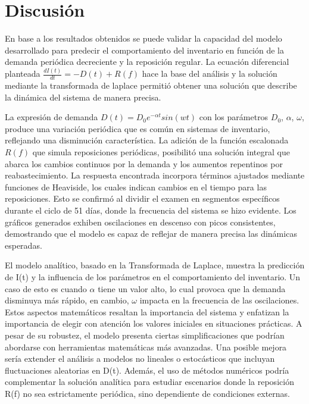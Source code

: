 \documentclass[12pt]{article}
\begin{document}
\section*{Discusión}
En base a los resultados obtenidos se puede validar la capacidad del modelo desarrollado para predecir el comportamiento del inventario en función de la demanda periódica decreciente y la reposición regular. La ecuación diferencial planteada $\frac{dI(t)}{dt} = - D(t) + R(f)$ hace la base del análisis y la solución mediante la transformada de laplace permitió obtener una solución que describe la dinámica del sistema de manera precisa.

La expresión de demanda $D(t) = D_{0}e^{- \alpha t}sin(wt)$ con los parámetros $D_{0}$, $\alpha$, $\omega$, produce una variación periódica que es común en sistemas de inventario, reflejando una disminución característica. La adición de la función escalonada $R(f)$ que simula reposiciones periódicas, posibilitó una solución integral que abarca los cambios continuos por la demanda y los aumentos repentinos por reabastecimiento. La respuesta encontrada incorpora términos ajustados mediante funciones de Heaviside, los cuales indican cambios en el tiempo para las reposiciones. Esto se confirmó al dividir el examen en segmentos específicos durante el ciclo de 51 días, donde la frecuencia del sistema se hizo evidente. Los gráficos generados exhiben oscilaciones en descenso con picos consistentes, demostrando que el modelo es capaz de reflejar de manera precisa las dinámicas esperadas.

El modelo analítico, basado en la Transformada de Laplace, muestra la predicción de I(t) y la influencia de los parámetros en el comportamiento del inventario. Un caso de esto es cuando $\alpha$  tiene un valor alto, lo cual provoca que la demanda disminuya más rápido, en cambio, $\omega$ impacta en la frecuencia de las oscilaciones. Estos aspectos matemáticos resaltan la importancia del sistema y enfatizan la importancia de elegir con atención los valores iniciales en situaciones prácticas. A pesar de su robustez, el modelo presenta ciertas simplificaciones que podrían abordarse con herramientas matemáticas más avanzadas. Una posible mejora sería extender el análisis a modelos no lineales o estocásticos que incluyan fluctuaciones aleatorias en D(t). Además, el uso de métodos numéricos podría complementar la solución analítica para estudiar escenarios donde la reposición R(f) no sea estrictamente periódica, sino dependiente de condiciones externas.
\end{document}
